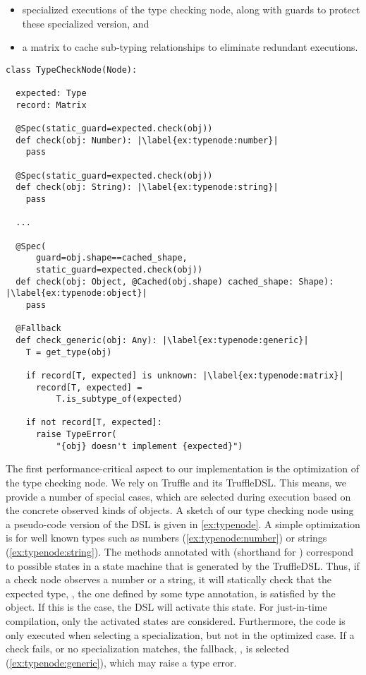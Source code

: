 \begin{itemize}
  \item specialized executions of the type checking node, along with guards to protect these specialized version, and
  \item a matrix to cache sub-typing relationships to eliminate redundant executions.
\end{itemize}
 

\begin{lstlisting}[label={ex:typenode},escapechar=|,caption={An illustration of the type checking node that support type checking},float,floatplacement=htbp,columns=flexible]
class TypeCheckNode(Node):

  expected: Type
  record: Matrix

  @Spec(static_guard=expected.check(obj))
  def check(obj: Number): |\label{ex:typenode:number}|
    pass

  @Spec(static_guard=expected.check(obj))
  def check(obj: String): |\label{ex:typenode:string}|
    pass

  ...

  @Spec(
      guard=obj.shape==cached_shape,
      static_guard=expected.check(obj))
  def check(obj: Object, @Cached(obj.shape) cached_shape: Shape): |\label{ex:typenode:object}|
    pass
  
  @Fallback
  def check_generic(obj: Any): |\label{ex:typenode:generic}|
    T = get_type(obj)
    
    if record[T, expected] is unknown: |\label{ex:typenode:matrix}|
      record[T, expected] =
          T.is_subtype_of(expected)

    if not record[T, expected]:
      raise TypeError(
          "{obj} doesn't implement {expected}")
\end{lstlisting}

The first performance-critical aspect to our implementation
is the optimization of the type checking node.
We rely on Truffle and its TruffleDSL\citep{humer2014domainspecific}.
This means, we provide a number of special cases,
which are selected during execution based on the concrete observed
kinds of objects.
A sketch of our type checking node using a pseudo-code version of the DSL
is given in \cref{ex:typenode}.
A simple optimization is for well known types such as
numbers (\cref{ex:typenode:number}) or strings (\cref{ex:typenode:string}).
The methods annotated with  (shorthand for )
correspond to possible states in a state machine that is generated by the
TruffleDSL.
Thus, if a check node observes a number or a string,
it will statically check that the expected type,
\ie, the one defined by some type annotation,
is satisfied by the object.
If this is the case, the DSL will activate this state.
For just-in-time compilation, only the activated states are considered.
Furthermore, the  code is only executed when selecting
a specialization, but not in the optimized case.
If a check fails, or no specialization matches, the fallback,
\ie,  is selected (\cref{ex:typenode:generic}),
which may raise a type error.

